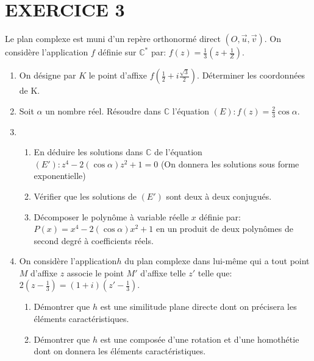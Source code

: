 \documentclass[12pts]{book}
\begin{document}
	\section*{EXERCICE 3}
		Le plan complexe est muni d'un repère orthonormé direct $(O,\overrightarrow{u},\overrightarrow{v})$. On considère l'application $f$ définie sur $\mathbb{C}^*$ par: $f(z)=\frac{1}{3}(z+\frac{1}{Z})$.
		\begin{enumerate}
			\item On désigne par $K$ le point d'affixe $f(\frac{1}{2}+i\frac{\sqrt{3}}{2})$. Déterminer les coordonnées de K.
			\item Soit $\alpha$ un nombre réel. Résoudre dans $\mathbb{C}$ l'équation $(E): f(z)=\frac{2}{3}\cos \alpha$.
			\item 
				\begin{enumerate}
					\item En déduire les solutions dans $\mathbb{C}$ de l'équation $(E'): z^4-2(\cos \alpha)z^2+1=0$ (On donnera les solutions sous forme exponentielle)
					\item Vérifier que les solutions de $(E')$ sont deux à deux conjugués.
					\item Décomposer le polynôme à variable réelle $x$ définie par: $P(x)=x^4-2(\cos \alpha )x^2+1$ en  un produit de deux polynômes de second degré à coefficients réels.
				\end{enumerate} 
			\item	On considère l'application$h$ du plan complexe dans lui-même qui a tout point $M$ d'affixe $z$ associe le point $M'$ d'affixe telle $z'$ telle que: $2(z-\frac{1}{3})=(1+i)(z'-\frac{1}{3})$.
				\begin{enumerate}
					\item  Démontrer que $h$ est une similitude plane directe dont on précisera les éléments caractéristiques.
					\item Démontrer que $h$ est une composée d'une rotation et d'une homothétie dont on donnera les éléments caractéristiques.
				\end{enumerate}
		
		\end{enumerate}
	
\end{document}
